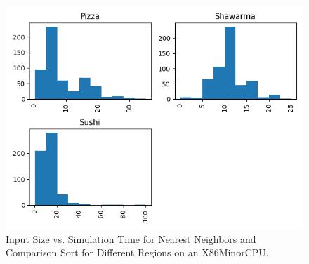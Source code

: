 \begin{figure}[t!]
    \centerline{\includegraphics[width=\columnwidth]{data/histogram_Q4.png}}
    \caption{Input Size vs. Simulation Time for Nearest Neighbors and Comparison Sort for Different Regions on an X86MinorCPU.}
    \label{f:instruction_time}
\end{figure}